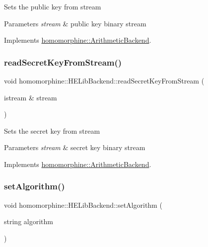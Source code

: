 Sets the public key from stream


\begin{DoxyParams}{Parameters}
{\em stream} & public key binary stream \\
\hline
\end{DoxyParams}


Implements \hyperlink{classhomomorphine_1_1_arithmetic_backend_aab5aac202ce0911e99e8adce7ffb707a}{homomorphine\+::\+Arithmetic\+Backend}.

\mbox{\label{classhomomorphine_1_1_h_e_lib_backend_ad1ed1336d11c5b75419efa58aa9071e3}} 
\subsubsection{\texorpdfstring{read\+Secret\+Key\+From\+Stream()}{readSecretKeyFromStream()}}
{\footnotesize\ttfamily void homomorphine\+::\+H\+E\+Lib\+Backend\+::read\+Secret\+Key\+From\+Stream (\begin{DoxyParamCaption}\item[{istream \&}]{stream }\end{DoxyParamCaption})\hspace{0.3cm}{\ttfamily [virtual]}}

Sets the secret key from stream


\begin{DoxyParams}{Parameters}
{\em stream} & secret key binary stream \\
\hline
\end{DoxyParams}


Implements \hyperlink{classhomomorphine_1_1_arithmetic_backend_a69b65cd979de00a9afa0c38c3b4329b0}{homomorphine\+::\+Arithmetic\+Backend}.

\mbox{\label{classhomomorphine_1_1_h_e_lib_backend_a39478377b0e299fd90f5c7bb6c8efe89}} 
\subsubsection{\texorpdfstring{set\+Algorithm()}{setAlgorithm()}}
{\footnotesize\ttfamily void homomorphine\+::\+H\+E\+Lib\+Backend\+::set\+Algorithm (\begin{DoxyParamCaption}\item[{string}]{algorithm }\end{DoxyParamCaption})\hspace{0.3cm}{\ttfamily [virtual]}}

